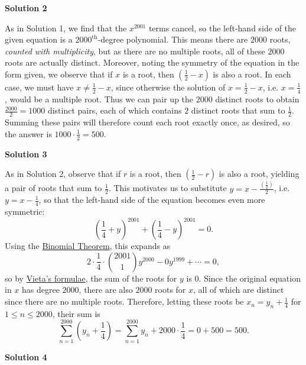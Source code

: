 \begin{enumerate}
\textbf{Solution 2}

As in Solution 1, we find that the $x^{2001}$ terms cancel, so the left-hand side of the given equation is a $2000^{\text{th}}$-degree polynomial. This means there are $2000$ roots, \textit{counted with multiplicity}, but as there are no multiple roots, all of these $2000$ roots are actually distinct. Moreover, noting the symmetry of the equation in the form given, we observe that if $x$ is a root, then $\left(\frac{1}{2}-x\right)$ is also a root. In each case, we must have $x \neq \frac{1}{2}-x$, since otherwise the solution of $x = \frac{1}{2}-x$, i.e. $x = \frac{1}{4}$, would be a multiple root. Thus we can pair up the $2000$ distinct roots to obtain $\frac{2000}{2} = 1000$ distinct pairs, each of which contains $2$ distinct roots that sum to $\frac{1}{2}$. Summing these pairs will therefore count each root exactly once, as desired, so the answer is $1000 \cdot \frac{1}{2} = \boxed{500}$.

 



\textbf{Solution 3}

As in Solution 2, observe that if $r$ is a root, then $\left(\frac{1}{2}-r\right)$ is also a root, yielding a pair of roots that sum to $\frac{1}{2}$. This motivates us to substitute $y = x-\frac{\left(\frac{1}{2}\right)}{2}$, i.e. $y = x-\frac{1}{4}$, so that the left-hand side of the equation becomes even more symmetric: 
 \[\left(\frac{1}{4}+y\right)^{2001}+\left(\frac{1}{4}-y\right)^{2001} = 0.\] Using the \href{https://artofproblemsolving.com/wiki/index.php?title=Binomial\_Theorem}{Binomial Theorem}, this expands as 
 \[2\cdot\frac{1}{4}\cdot\binom{2001}{1}y^{2000}-0y^{1999}+\dotsb = 0,\] so by \href{https://artofproblemsolving.com/wiki/index.php?title=Vieta\%27s\_formulas}{Vieta's formulae}, the sum of the roots for $y$ is 0. Since the original equation in $x$ has degree $2000$, there are also $2000$ roots for $x$, all of which are distinct since there are no multiple roots. Therefore, letting these roots be $x_n = y_n+\frac{1}{4}$ for $1 \leq n \leq 2000$, their sum is 
 \[\sum_{n=1}^{2000}\left(y_n+\frac{1}{4}\right) = \sum_{n=1}^{2000}y_n + 2000 \cdot \frac{1}{4} = 0 + 500 =\boxed{500}.\]




\textbf{Solution 4}


\end{enumerate}
